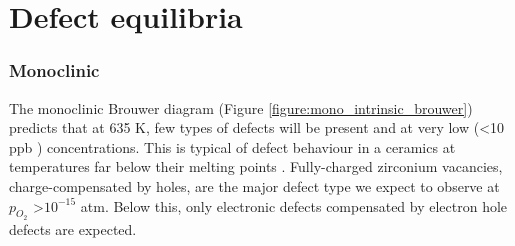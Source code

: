 \section{Defect equilibria}

\subsubsection*{Monoclinic}

The monoclinic Brouwer diagram (Figure \ref{figure:mono_intrinsic_brouwer}) predicts that at 635 K, few types of defects will be present and at very low (\textless 10 ppb \zirconia ) concentrations. This is typical of defect behaviour in a ceramics at temperatures far below their melting points \cite{kingery1997physical,ball2006computer}. Fully-charged zirconium vacancies, charge-compensated by holes, are the major defect type we expect to observe at $p_{O_{2}}$ \textgreater $10^{-15}$ atm. Below this, only electronic defects compensated by electron hole defects are expected. 


